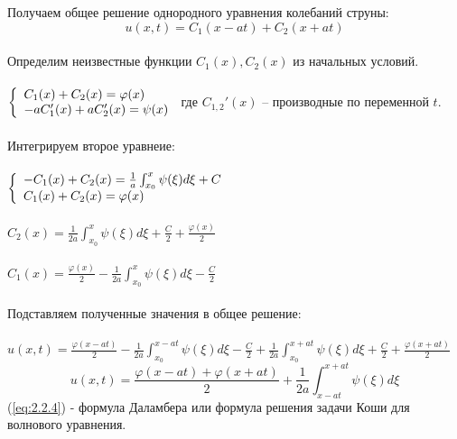 \documentclass[../main.tex]{subfiles}
\begin{document}
Получаем общее решение однородного уравнения колебаний струны:\\
\[u(x,t)=C_1(x-at)+C_2(x+at)\]\\
Определим неизвестные функции $C_1(x), C_2(x)$ из начальных условий.\\\\
$
	\begin{left}
		\{
		\begin{array}{lcl}
			C_{1}(x)+C_2(x)=\varphi(x) \\
			-aC_1'(x)+aC_2'(x)=\psi(x) \\
		\end{array}
		\right.
	\end{left}
$
 где $C_{1,2}'(x)$ -- производные по переменной $t$.\\
\\Интегрируем второе уравнеие:\\\\
$
	\begin{left}
		\{
		\begin{array}{lcl}
			-C_1(x)+C_2(x)=\frac{1}{a}\int_{x_0}^x\psi(\xi)d\xi+C \\
			C_1(x)+C_2(x)=\varphi(x)                              \\
		\end{array}
		\right.
	\end{left}
$
\\\\
$C_2(x)=\frac{1}{2a}\int_{x_0}^x\psi(\xi)d\xi+\frac{C}{2}+\frac{\varphi(x)}{2}$\\\\
$C_1(x)=\frac{\varphi(x)}{2}-\frac{1}{2a}\int_{x_0}^x\psi(\xi)d\xi-\frac{C}{2}$\\\\
Подставляем полученные значения в общее решение:\\\\
$u(x,t)=\frac{\varphi(x-at)}{2}-\frac{1}{2a}\int_{x_0}^{x-at}\psi(\xi)d\xi-\frac{C}{2}+\frac{1}{2a}\int_{x_0}^{x+at}\psi(\xi)d\xi+\frac{C}{2}+\frac{\varphi(x+at)}{2}$
\begin{equation}\label{eq:2.2.4}
	u(x,t)=\frac{\varphi(x-at)+\varphi(x+at)}{2}+\frac{1}{2a}\int_{x-at}^{x+at}\psi(\xi)d\xi
\end{equation}
(\ref{eq:2.2.4}) - формула Даламбера или формула решения задачи Коши для волнового уравнения.
\end{document}
